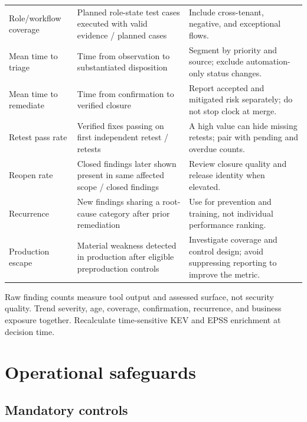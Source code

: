 \documentclass[11pt,letterpaper]{article}
\begin{document}
\begin{longtable}{@{}L{1.35in}L{1.85in}L{3.35in}@{}}
Role/workflow coverage & Planned role-state test cases executed with valid evidence / planned cases & Include cross-tenant, negative, and exceptional flows. \\
Mean time to triage & Time from observation to substantiated disposition & Segment by priority and source; exclude automation-only status changes. \\
Mean time to remediate & Time from confirmation to verified closure & Report accepted and mitigated risk separately; do not stop clock at merge. \\
Retest pass rate & Verified fixes passing on first independent retest / retests & A high value can hide missing retests; pair with pending and overdue counts. \\
Reopen rate & Closed findings later shown present in same affected scope / closed findings & Review closure quality and release identity when elevated. \\
Recurrence & New findings sharing a root-cause category after prior remediation & Use for prevention and training, not individual performance ranking. \\
Production escape & Material weakness detected in production after eligible preproduction controls & Investigate coverage and control design; avoid suppressing reporting to improve the metric. \\
\bottomrule
\end{longtable}

Raw finding counts measure tool output and assessed surface, not security quality. Trend severity, age, coverage, confirmation, recurrence, and business exposure together. Recalculate time-sensitive KEV and EPSS enrichment at decision time.

\section{Operational safeguards}

\subsection{Mandatory controls}
\end{document}
